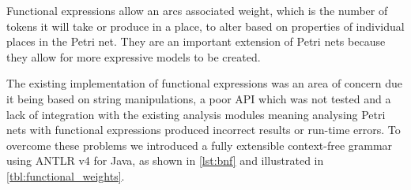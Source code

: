 Functional expressions allow an arcs associated weight, which is the number of tokens it will take or produce in a place, to alter based on properties of individual places in the Petri net. They are an important extension of Petri nets because they allow for more expressive models to be created.


The existing implementation of functional expressions was an area of concern due it being based on string manipulations, a poor API which was not tested and a lack of integration with the existing analysis modules meaning analysing Petri nets with functional expressions produced incorrect results or run-time errors. To overcome these problems we introduced a fully extensible context-free grammar using ANTLR v4 for Java, as shown in \cref{lst:bnf} and illustrated in \cref{tbl:functional_weights}.


